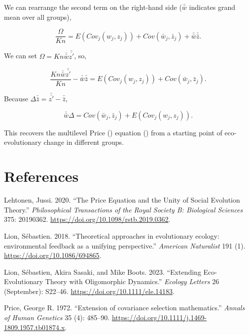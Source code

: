 \documentclass[
]{article}
\newlength{\cslhangindent}
\newenvironment{CSLReferences}[2] %
 {\begin{list}{}{%
  \setlength{\itemindent}{0pt}
  \setlength{\leftmargin}{0pt}
  \setlength{\parsep}{0pt}
  \ifodd #1
   \setlength{\leftmargin}{\cslhangindent}
   \setlength{\itemindent}{-1\cslhangindent}
  \fi
  \setlength{\itemsep}{#2\baselineskip}}}
 {\end{list}}
\begin{document}
We can rearrange the second term on the right-hand side
(\(\bar{\bar{w}}\) indicates grand mean over all groups),

\[\frac{\Omega}{K n} = E\left(Cov_{j}\left(w_{j}, z_{j}\right)\right) +  Cov\left(\bar{w}_{j}, \bar{z}_{j} \right) + \bar{\bar{w}}\bar{\bar{z}}.\]

We can set \(\Omega = Kn\bar{\bar{w}}\bar{\bar{z'}}\), so,

\[\frac{Kn\bar{\bar{w}}\bar{\bar{z'}}}{K n} - \bar{\bar{w}}\bar{\bar{z}} = E\left(Cov_{j}\left(w_{j}, z_{j}\right)\right) +  Cov\left(\bar{w}_{j}, \bar{z}_{j} \right).\]

Because \(\Delta \bar{\bar{z}} = \bar{\bar{z'}} - \bar{\bar{z}}\),

\[\bar{\bar{w}}\Delta = Cov\left(\bar{w}_{j}, \bar{z}_{j} \right) + E\left(Cov_{j}\left(w_{j}, z_{j}\right)\right).\]

This recovers the multilevel Price ()
equation () from a starting
point of eco-evolutionary change in different groups.

\section*{References}\label{references}

\label{refs}
\begin{CSLReferences}{1}{0}
Lehtonen, Jussi. 2020. {``The Price Equation and the Unity of Social
Evolution Theory.''} \emph{Philosophical Transactions of the Royal
Society B: Biological Sciences} 375: 20190362.
\url{https://doi.org/10.1098/rstb.2019.0362}.

Lion, Sébastien. 2018. {``{Theoretical approaches in evolutionary
ecology: environmental feedback as a unifying perspective}.''}
\emph{American Naturalist} 191 (1).
\url{https://doi.org/10.1086/694865}.

Lion, Sébastien, Akira Sasaki, and Mike Boots. 2023. {``Extending
Eco-Evolutionary Theory with Oligomorphic Dynamics.''} \emph{Ecology
Letters} 26 (September): S22--46.
\url{https://doi.org/10.1111/ele.14183}.

Price, George R. 1972. {``{Extension of covariance selection
mathematics}.''} \emph{Annals of Human Genetics} 35 (4): 485--90.
\url{https://doi.org/10.1111/j.1469-1809.1957.tb01874.x}.

\end{CSLReferences}
\end{document}
